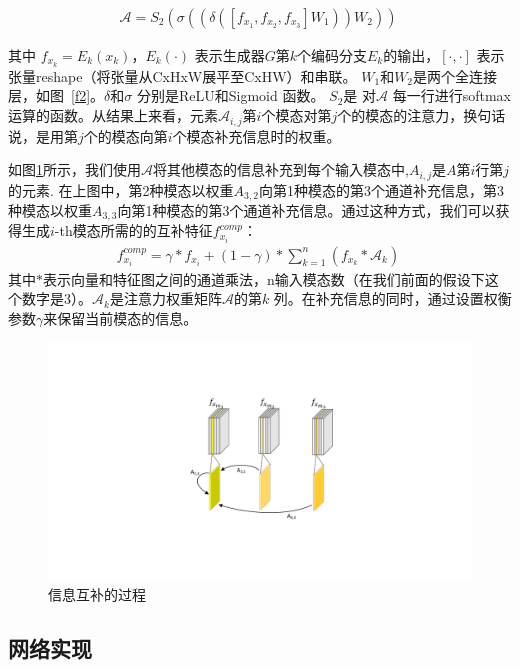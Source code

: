 \begin{align}
	\mathcal{A} = S_2(\sigma((\delta([f_{x_1}, f_{x_2}, f_{x_3}]W_1))W_2))\
	\label{e1}
\end{align}

其中 $f_{x_k}=E_k(x_k)$，$E_k(\cdot)$ 表示生成器$G$第$k$个编码分支$E_k$的输出，$[\cdot,\cdot]$ 表示张量reshape（将张量从CxHxW展平至CxHW）和串联。 $W_1$和$W_2$是两个全连接层，如图~\ref{f2}。$\delta$和$\sigma$ 分别是ReLU\cite{nair2010rectified}和Sigmoid 函数。 $S_2$是 对$\mathcal{A}$ 每一行进行softmax运算的函数。从结果上来看，元素$\mathcal{A}_{i,j}$第$i$个模态对第$j$个的模态的注意力，换句话说，是用第$j$个的模态向第$i$个模态补充信息时的权重。

如图\ref{fig:Complementary}所示，我们使用$\mathcal{A}$将其他模态的信息补充到每个输入模态中,$A_{i,j}$是$A$第$i$行第$j$的元素. 在上图中，第2种模态以权重$A_{3,2}$向第1种模态的第3个通道补充信息，第3种模态以权重$A_{3,3}$向第1种模态的第3个通道补充信息。通过这种方式，我们可以获得生成$i$-th模态所需的的互补特征$f_{x_i}^{comp}$：
\begin{gather}
	f_{x_i}^{comp} = \gamma * f_{x_i} +
	(1-\gamma) * \sum_{k=1}^n (f_{x_k} * \mathcal{A}_{k})\
\end{gather}
其中$*$表示向量和特征图之间的通道乘法，n输入模态数（在我们前面的假设下这个数字是3）。$\mathcal{A}_{k}$是注意力权重矩阵$\mathcal{A}$的第$k$ 列。在补充信息的同时，通过设置权衡参数$\gamma$来保留当前模态的信息。

\begin{figure}
	\centering
	\includegraphics[width=0.8\columnwidth]{figures/JAGAN/20201109InterAttention_function_BV1_0.pdf}
	\caption[aaa]{信息互补的过程} 
	\label{fig:Complementary}
\end{figure}

\subsection{网络实现}

